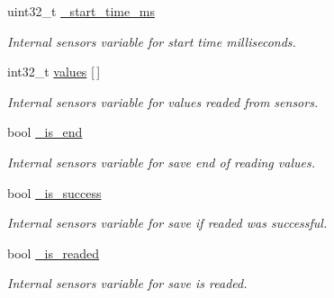 \begin{DoxyCompactItemize}
\mbox{\label{classSensorDriver_a542b221f1e79b72badf2b4c68883111b}} 
uint32\+\_\+t \hyperlink{classSensorDriver_a542b221f1e79b72badf2b4c68883111b}{\+\_\+start\+\_\+time\+\_\+ms}
\begin{DoxyCompactList}\small\item\em Internal sensor\textquotesingle{}s variable for start time milliseconds. \end{DoxyCompactList}\item 
\mbox{\label{classSensorDriver_a133e97d4b06f8b4d12265df0ac0bf9ed}} 
int32\+\_\+t \hyperlink{classSensorDriver_a133e97d4b06f8b4d12265df0ac0bf9ed}{values} \mbox{[}$\,$\mbox{]}
\begin{DoxyCompactList}\small\item\em Internal sensor\textquotesingle{}s variable for values readed from sensors. \end{DoxyCompactList}\item 
\mbox{\label{classSensorDriver_ab3c5ceebf49b96af8a9f96d7cc6fdef8}} 
bool \hyperlink{classSensorDriver_ab3c5ceebf49b96af8a9f96d7cc6fdef8}{\+\_\+is\+\_\+end}
\begin{DoxyCompactList}\small\item\em Internal sensor\textquotesingle{}s variable for save end of reading values. \end{DoxyCompactList}\item 
\mbox{\label{classSensorDriver_a80a57f982b9d5eb776a34ecc601334b3}} 
bool \hyperlink{classSensorDriver_a80a57f982b9d5eb776a34ecc601334b3}{\+\_\+is\+\_\+success}
\begin{DoxyCompactList}\small\item\em Internal sensor\textquotesingle{}s variable for save if readed was successful. \end{DoxyCompactList}\item 
\mbox{\label{classSensorDriver_a7a418701714073a0768c2b1ce1104c2b}} 
bool \hyperlink{classSensorDriver_a7a418701714073a0768c2b1ce1104c2b}{\+\_\+is\+\_\+readed}
\begin{DoxyCompactList}\small\item\em Internal sensor\textquotesingle{}s variable for save is readed. \end{DoxyCompactList}\end{DoxyCompactItemize}


